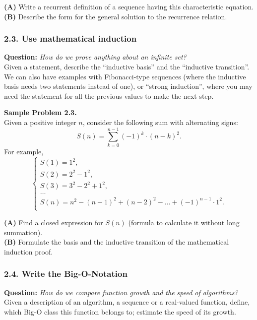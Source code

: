 \documentclass[jou]{apa6}
\begin{document}
{\bf (A)} Write a recurrent definition of a sequence having this characteristic equation.\\
{\bf (B)} Describe the form for the general solution to the recurrence relation.



\subsubsection{2.3. Use mathematical induction}

{\bf Question:} {\em How do we prove anything about an infinite set?}\\
{\scriptsize 
Given a statement, describe the “inductive basis” and the ``inductive transition''. 
We can also have examples with Fibonacci-type sequences 
(where the inductive basis needs two statements instead of one), 
or ``strong induction'', where you may need the statement 
for all the previous values to make the next step.
}

\vspace{6pt}
{\bf Sample Problem 2.3.}\\
Given a positive integer $n$, consider the following sum with alternating signs:
$$S(n) = \sum\limits_{k=0}^{n-1} (-1)^k \cdot (n-k)^2.$$
For example, 
$$\left\{ \begin{array}{l}
S(1) = 1^2,\\
S(2) = 2^2 - 1^2,\\
S(3) = 3^2 - 2^2 + 1^2,\\
\ldots \\
S(n) = n^2 - (n-1)^2 + (n-2)^2 - \ldots + (-1)^{n-1} \cdot 1^2.\\
\end{array}
\right.$$

{\bf (A)} Find a closed expression for $S(n)$ (formula to calculate it without long summation).\\
{\bf (B)} Formulate the basis and the inductive transition of 
the mathematical induction proof.



\subsubsection{2.4. Write the Big-O-Notation} 

{\bf Question:} {\em How do we compare function growth and the speed of algorithms?}\\
{\scriptsize 
Given a description of an algorithm, a sequence or a real-valued function, 
define, which Big-O class this function belongs to; estimate the speed of its growth.
}
\end{document}
